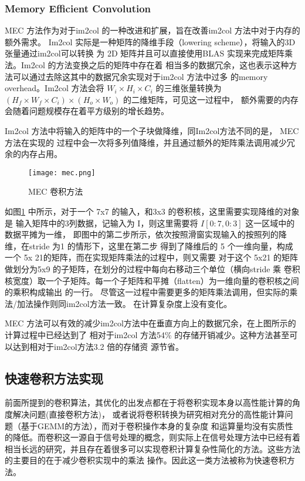 \subsubsection{Memory Efficient Convolution}

MEC 方法\cite{Cho2017MECMC}作为对于im2col 的一种改进和扩展，旨在改善im2col 方法中对于内存的额外需求。
Im2col 实际是一种矩阵的降维手段（lowering scheme），将输入的3D 张量通过im2col可以转换
为 2D 矩阵并且可以直接使用BLAS 实现来完成矩阵乘法。Im2col 的方法变换之后的矩阵中存在着
相当多的数据冗余，这也表示这种方法可以通过去除这其中的数据冗余实现对于im2col 方法中过多
的memory overhead。Im2col 方法会将 $ W_i \times H_i \times C_i $ 的三维张量转换为 
$(H_f \times W_f \times C_i) \times (H_o \times W_o) $ 的二维矩阵，可见这一过程中，
额外需要的内存会随着问题规模存在着平方级别的增长趋势。

Im2col 方法中将输入的矩阵中的一个子块做降维，同Im2col方法不同的是， MEC 方法在实现的
过程中会一次将多列值降维，并且通过额外的矩阵乘法调用减少冗余的内存占用。

\begin{figure}
  \centering
  \texttt{[image: mec.png]}
  \caption{MEC 卷积方法}
  \label{fig:mec}
\end{figure}

如图\ref{fig:mec} 中所示，对于一个 7x7 的输入，和3x3 的卷积核，这里需要实现降维的对象是
输入矩阵中的3列数据，记输入为 I，则这里需要将 $ I[0:7, 0:3] $ 这一区域中的数据平摊为一维，
即图中的第二步所示，依次按照滑窗实现输入的按照列的降维，在stride 为1 的情形下，这里在第二步
得到了降维后的 5 个一维向量，构成一个 5x 21的矩阵，而在实现矩阵乘法的过程中，则又需要
对于这个 5x21 的矩阵做划分为5x9 的子矩阵，在划分的过程中每向右移动三个单位（横向stride 乘
卷积核宽度）取一个子矩阵。每一个子矩阵和平摊（flatten）为一维向量的卷积核之间的乘积构成输出
的一行。 尽管这一过程中需要更多的矩阵乘法调用，但实际的乘法/加法操作则同im2col方法一致。
在计算复杂度上没有变化。


MEC 方法可以有效的减少im2col方法中在垂直方向上的数据冗余，在上图所示的计算过程中已经达到了
相对于im2col 方法54\% 的存储开销减少。这种方法甚至可以达到相对于im2col方法3.2 倍的存储资
源节省。

\subsection{快速卷积方法实现}

前面所提到的卷积算法，其优化的出发点都在于将卷积实现本身以高性能计算的角度解决问题(直接卷积方法)，
或者说将卷积转换为研究相对充分的高性能计算问题（基于GEMM的方法），而对于卷积操作本身的复杂度
和运算量均没有实质性的降低。而卷积这一源自于信号处理的概念，则实际上在信号处理方法中已经有着
相当长远的研究，并且存在着很多可以实现卷积计算复杂性简化的方法。这些方法的主要目的在于减少卷积实现中的乘法
操作。因此这一类方法被称为快速卷积方法。

